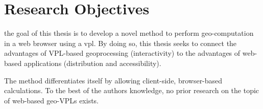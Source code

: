 




\section{Research Objectives}
the goal of this thesis is to develop a novel method to perform geo-computation in a web browser using a \ac{vpl}. 
By doing so, this thesis seeks to connect the advantages of VPL-based geoprocessing (interactivity) to the advantages of web-based applications (distribution and accessibility).

The method differentiates itself by allowing client-side, browser-based calculations. 
To the best of the authors knowledge, no prior research on the topic of web-based geo-VPLs exists.







